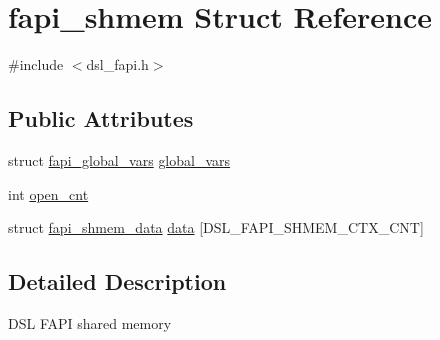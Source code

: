 \hypertarget{structfapi__shmem}{\section{fapi\-\_\-shmem Struct Reference}
\label{structfapi__shmem}
}


{\ttfamily \#include $<$dsl\-\_\-fapi.\-h$>$}

\subsection*{Public Attributes}
\begin{DoxyCompactItemize}
\item 
struct \hyperlink{structfapi__global__vars}{fapi\-\_\-global\-\_\-vars} \hyperlink{structfapi__shmem_af7ee2d7aa3f9a4097e53353ee942f372}{global\-\_\-vars}
\item 
int \hyperlink{structfapi__shmem_a5732da0ec59d14cecd04eb88c4b48816}{open\-\_\-cnt}
\item 
struct \hyperlink{structfapi__shmem__data}{fapi\-\_\-shmem\-\_\-data} \hyperlink{structfapi__shmem_a790da050e59940c76878a18af361e72c}{data} \mbox{[}D\-S\-L\-\_\-\-F\-A\-P\-I\-\_\-\-S\-H\-M\-E\-M\-\_\-\-C\-T\-X\-\_\-\-C\-N\-T\mbox{]}
\end{DoxyCompactItemize}


\subsection{Detailed Description}
D\-S\-L F\-A\-P\-I shared memory 

